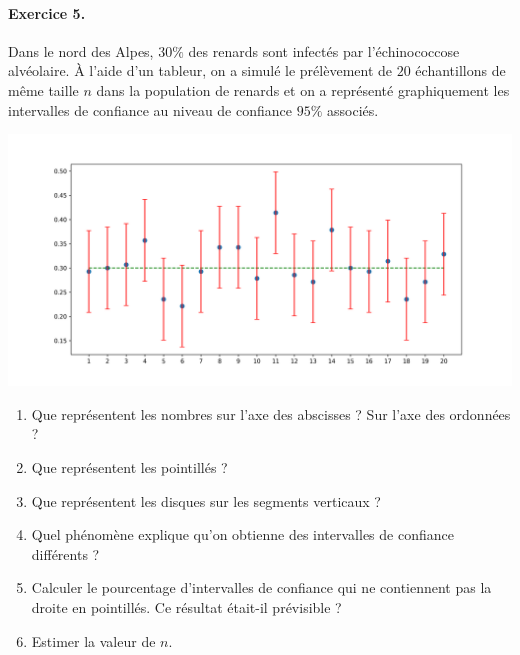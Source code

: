 \documentclass[11pt]{article}
\begin{document}
\paragraph{Exercice 5.} Dans le nord des Alpes, $30\%$ des renards sont infectés par l’échinococcose alvéolaire.
À l’aide d’un tableur, on a simulé le prélèvement de $20$ échantillons de même
taille $n$ dans la
population de renards et on a représenté graphiquement les intervalles de confiance au niveau
de confiance $95\%$ associés.
\begin{center}
\includegraphics[width=\textwidth]{exo.png}
\end{center}
\begin{enumerate}
  \item Que représentent les nombres sur l’axe des abscisses ? Sur l’axe des ordonnées ?
  \item Que représentent les pointillés ?
  \item Que représentent les disques sur les segments verticaux ?
  \item Quel phénomène explique qu’on obtienne des intervalles de confiance différents ?
  \item Calculer le pourcentage d’intervalles de confiance qui ne contiennent
    pas la droite en pointillés. Ce résultat était-il prévisible ?
\item Estimer la valeur de $n$.
\end{enumerate}
\end{document}
